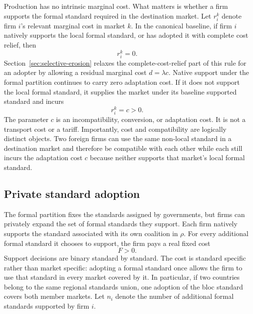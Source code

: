 Production has no intrinsic marginal cost. What matters is whether a firm supports the formal standard required in the destination market. Let $r_i^k$ denote firm $i$'s relevant marginal cost in market $k$. In the canonical baseline, if firm $i$ natively supports the local formal standard, or has adopted it with complete cost relief, then
\begin{equation}
    r_i^k=0.
    \label{eq:marginal-cost-compatible}
\end{equation}
Section~\ref{sec:selective-erosion} relaxes the complete-cost-relief part of this rule for an adopter by allowing a residual marginal cost $d=\lambda c$. Native support under the formal partition continues to carry zero adaptation cost.
If it does not support the local formal standard, it supplies the market under its baseline supported standard and incurs
\begin{equation}
    r_i^k=c>0.
    \label{eq:marginal-cost-incompatible}
\end{equation}
The parameter $c$ is an incompatibility, conversion, or adaptation cost. It is not a transport cost or a tariff. Importantly, cost and compatibility are logically distinct objects. Two foreign firms can use the same non-local standard in a destination market and therefore be compatible with each other while each still incurs the adaptation cost $c$ because neither supports that market's local formal standard.

\subsection{Private standard adoption}
\label{subsec:model-private-adoption}

The formal partition fixes the standards assigned by governments, but firms can privately expand the set of formal standards they support. Each firm natively supports the standard associated with its own coalition in $\rho$. For every additional formal standard it chooses to support, the firm pays a real fixed cost
\begin{equation}
    F>0.
    \label{eq:private-adoption-cost}
\end{equation}
Support decisions are binary standard by standard. The cost is standard specific rather than market specific: adopting a formal standard once allows the firm to use that standard in every market covered by it. In particular, if two countries belong to the same regional standards union, one adoption of the bloc standard covers both member markets. Let $n_i$ denote the number of additional formal standards supported by firm $i$.

